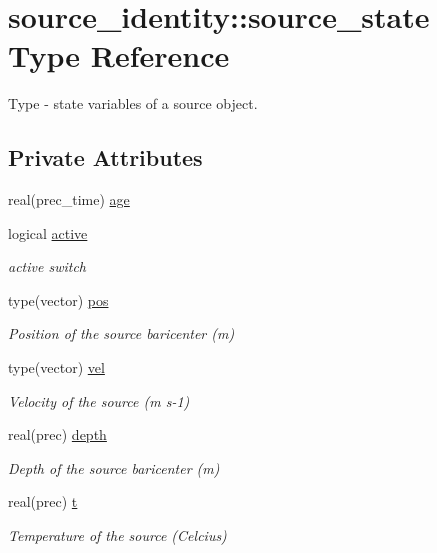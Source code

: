 \hypertarget{structsource__identity_1_1source__state}{}\section{source\+\_\+identity\+:\+:source\+\_\+state Type Reference}
\label{structsource__identity_1_1source__state}


Type -\/ state variables of a source object.  


\subsection*{Private Attributes}
\begin{DoxyCompactItemize}
\item 
real(prec\+\_\+time) \hyperlink{structsource__identity_1_1source__state_a311e00a4f1872202e513c0ac498e0619}{age}
\item 
logical \hyperlink{structsource__identity_1_1source__state_ae70b1762af6a3fd60f76226ac858cd6d}{active}
\begin{DoxyCompactList}\small\item\em active switch \end{DoxyCompactList}\item 
type(vector) \hyperlink{structsource__identity_1_1source__state_a070917562792ada99bdb2eaa2b5274e8}{pos}
\begin{DoxyCompactList}\small\item\em Position of the source baricenter (m) \end{DoxyCompactList}\item 
type(vector) \hyperlink{structsource__identity_1_1source__state_aea32db0332ef565f04ab210f5b17dba1}{vel}
\begin{DoxyCompactList}\small\item\em Velocity of the source (m s-\/1) \end{DoxyCompactList}\item 
real(prec) \hyperlink{structsource__identity_1_1source__state_a1986d6dec1ccc5bbfd54e4bbc8f2e4d5}{depth}
\begin{DoxyCompactList}\small\item\em Depth of the source baricenter (m) \end{DoxyCompactList}\item 
real(prec) \hyperlink{structsource__identity_1_1source__state_ac370880f81e096a7aabb9fca144143fb}{t}
\begin{DoxyCompactList}\small\item\em Temperature of the source (Celcius) \end{DoxyCompactList}\end{DoxyCompactItemize}


